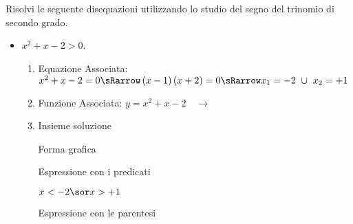 \begin{esempio}
Risolvi le seguente disequazioni utilizzando lo studio del segno del trinomio 
di secondo grado.



\begin{comment}
\begin{minipage}{.49\linewidth}
 
\end{minipage}
\hfill
\begin{minipage}{.49\linewidth}
 
\end{minipage}
\end{comment}

\begin{itemize}
\item $x^2+x-2>0$.

\begin{enumerate}
 \item
  Equazione Associata:~\(x^2+x-2=0 \sRarrow 
                        \left(x-1 \right)\left(x+2\right)=0 \sRarrow 
                        x_1=-2~\cup~x_2=+1\)
 \item 
  \begin{minipage}{.45\textwidth}
  Funzione Associata: \(y = x^2+x-2 \quad \rightarrow\)
  \end{minipage}
  \begin{minipage}{.30\textwidth}
  \end{minipage}
 \item 
 Insieme soluzione\\
 
  \begin{minipage}{.32\textwidth}
  Forma grafica\\[-.7em]
  
 \begin{center}
  \vspace{.4em}
 \end{center}
  \end{minipage}
  \begin{minipage}{.32\textwidth}
  Espressione con i predicati\\[-.3em]
  
 \begin{center}
  \(x<-2 \sor x>+1\)
  \vspace{1em}
 \end{center}
  \end{minipage}
  \begin{minipage}{.32\textwidth}
  Espressione con le parentesi\\[-.3em]
  

\end{minipage}
\end{enumerate}
\end{itemize}
\end{esempio}
